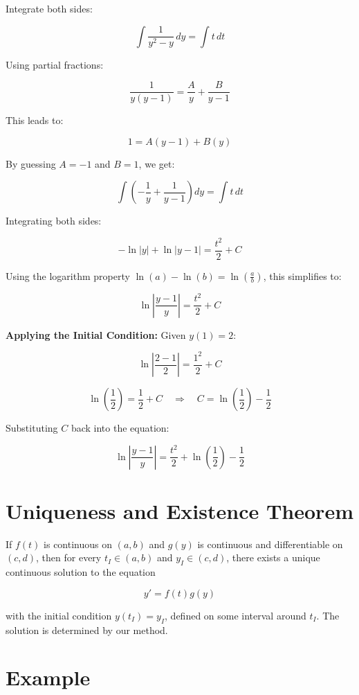 \documentclass{article}
\begin{document}
Integrate both sides:

\[
\int \frac{1}{y^2 - y} \, dy = \int t \, dt
\]

Using partial fractions:

\[
\frac{1}{y(y-1)} = \frac{A}{y} + \frac{B}{y-1}
\]

This leads to:

\[
1 = A(y - 1) + B(y) 
\]

By guessing \( A = -1 \) and \( B = 1 \), we get:

\[
\int \left( -\frac{1}{y} + \frac{1}{y-1} \right) dy = \int t \, dt
\]

Integrating both sides:

\[
-\ln|y| + \ln|y - 1| = \frac{t^2}{2} + C
\]

Using the logarithm property \( \ln(a) - \ln(b) = \ln\left(\frac{a}{b}\right) \), this simplifies to:

\[
\ln\left|\frac{y - 1}{y}\right| = \frac{t^2}{2} + C
\]

\textbf{Applying the Initial Condition:}  
Given \( y(1) = 2 \):

\[
\ln\left|\frac{2 - 1}{2}\right| = \frac{1^2}{2} + C
\]

\[
\ln\left(\frac{1}{2}\right) = \frac{1}{2} + C \quad \Rightarrow \quad C = \ln\left(\frac{1}{2}\right) - \frac{1}{2}
\]

Substituting \( C \) back into the equation:

\[
\ln\left|\frac{y - 1}{y}\right| = \frac{t^2}{2} + \ln\left(\frac{1}{2}\right) - \frac{1}{2}
\]




\section*{Uniqueness and Existence Theorem}

If \( f(t) \) is continuous on \( (a, b) \) and \( g(y) \) is continuous and differentiable on \( (c, d) \), then for every \( t_I \in (a, b) \) and \( y_I \in (c, d) \), there exists a unique continuous solution to the equation

\[
y' = f(t)g(y)
\]

with the initial condition \( y(t_I) = y_I \), defined on some interval around \( t_I \). The solution is determined by our method.

\section*{Example}
\end{document}
